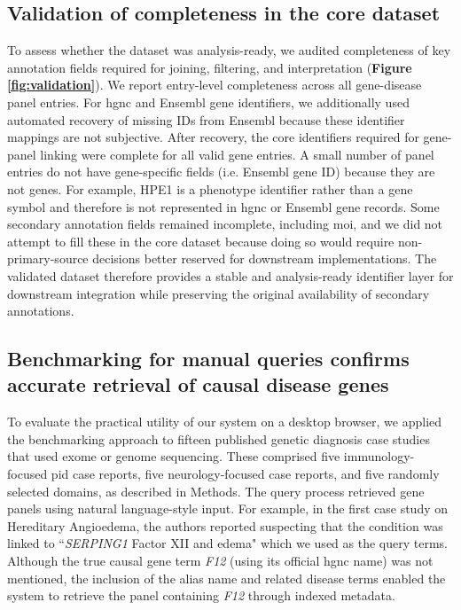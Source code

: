 \subsection{Validation of completeness in the core dataset}
\noindent
To assess whether the dataset was analysis-ready, we audited completeness of key annotation fields required for joining, filtering, and interpretation (\textbf{Figure \ref{fig:validation}}). 
We report entry-level completeness across all gene-disease panel entries. For \ac{hgnc} and Ensembl gene identifiers, we additionally used automated recovery of missing IDs from Ensembl because these identifier mappings are not subjective. 
After recovery, the core identifiers required for gene-panel linking were complete for all valid gene entries. A small number of panel entries do not have gene-specific fields (i.e. Ensembl gene ID) because they are not genes. For example, HPE1 is a phenotype identifier rather than a gene symbol and therefore is not represented in \ac{hgnc} or Ensembl gene records.
Some secondary annotation fields remained incomplete, including \ac{moi}, and we did not attempt to fill these in the core dataset because doing so would require non-primary-source decisions better reserved for downstream implementations. The validated dataset therefore provides a stable and analysis-ready identifier layer for downstream integration while preserving the original availability of secondary annotations.

\subsection{Benchmarking for manual queries confirms accurate retrieval of causal disease genes}
\noindent
To evaluate the practical utility of our system on a desktop browser, we applied the benchmarking approach to fifteen published genetic diagnosis case studies that used exome or genome sequencing. These comprised five immunology-focused \ac{pid} case reports, five neurology-focused case reports, and five randomly selected domains, as described in Methods. 
The query process retrieved gene panels using natural language-style input. 
For example, in the first case study on Hereditary Angioedema, the authors reported suspecting that the condition was linked to ``\textit{SERPING1} Factor XII and edema" which we used as the query terms. 
Although the true causal gene term \textit{F12} (using its official \ac{hgnc} name) was not mentioned, the inclusion of the alias name and related disease terms enabled the system to retrieve the panel containing \textit{F12} through indexed metadata.

